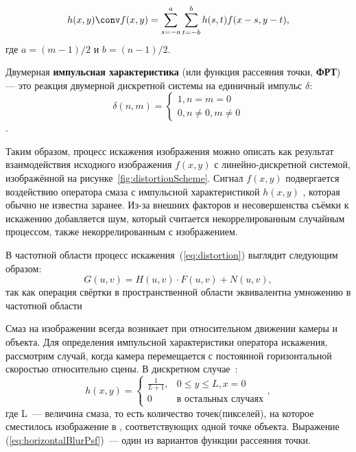 \begin{equation}
h(x,y) \conv f(x,y) = \sum_{s=-a}^{a}\sum_{t=-b}^{b}h(s,t)f(x-s, y-t),
\end{equation}
где $a=(m-1)/2$ и $b = (n-1)/2$.

\begin{definition}\label{def:impulseResponse}
Двумерная \textbf{импульсная характеристика} (или функция рассеяния точки, \textbf{ФРТ}) — это реакция двумерной дискретной системы на единичный импульс $\delta$:
$$\delta(n,m) = 
	\begin{cases}
		1, n=m=0\\
		0, n\ne 0, m\ne 0
	\end{cases}$$.
\end{definition}

Таким образом, процесс искажения изображения можно описать как результат взаимодействия исходного изображения $f(x, y)$ с линейно-дискретной системой, изображённой на рисунке~\ref{fig:distortionScheme}. Сигнал $f(x, y)$ подвергается воздействию оператора смаза с импульсной характеристикой $h(x, y)$ , которая обычно не известна заранее. Из-за внешних факторов и несовершенства съёмки к искажению добавляется шум, который считается некоррелированным случайным процессом, также некоррелированным с изображением.

В частотной области процесс искажения~(\ref{eq:distortion}) выглядит следующим образом:
\begin{equation}\label{eq:distortionFourier}
G(u,v) = H(u,v)\cdot F(u,v) + N(u,v),
\end{equation}
так как операция свёртки в пространственной области эквивалентна умножению в частотной области\cite[стр.~39]{basicsOfDigitalDataProcessing2016Umnyashkin}

Смаз на изображении всегда возникает при относительном движении камеры и объекта. Для определения импульсной характеристики оператора искажения, рассмотрим случай, когда камера перемещается с постоянной горизонтальной скоростью относительно сцены. В дискретном случае~\cite{iterableImageRestorationBiemonLangdeik}:
\begin{equation}\label{eq:horizontalBlurPsf}
	h(x,y) = 
		\begin{cases}
			\frac{1}{L+1}, & 0 \leq y \leq L, x=0\\
			0              & \text{в остальных случаях}
		\end{cases},
\end{equation}
где L~--- величина смаза, то есть количество точек(пикселей), на которое сместилось изображение в , соответствующих одной точке объекта. Выражение (\ref{eq:horizontalBlurPsf})~--- один из вариантов функции рассеяния точки.

